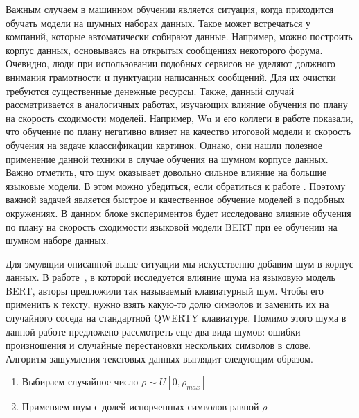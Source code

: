 \documentclass{spbau-diploma}
\begin{document}
Важным случаем в машинном обучении является ситуация, когда приходится обучать модели на шумных наборах данных. Такое может встречаться у компаний, которые автоматически собирают данные. Например, можно построить корпус данных, основываясь на открытых сообщениях некоторого форума. Очевидно, люди при использовании подобных сервисов не уделяют должного внимания грамотности и пунктуации написанных сообщений. Для их очистки требуются существенные денежные ресурсы. Также, данный случай рассматривается в аналогичных работах, изучающих влияние обучения по плану на скорость сходимости моделей. Например, Wu и его коллеги в работе \cite{wu2020curricula} показали, что обучение по плану негативно влияет на качество итоговой модели и скорость обучения на задаче классификации картинок. Однако, они нашли полезное применение данной техники в случае обучения на шумном корпусе данных. Важно отметить, что шум оказывает довольно сильное влияние на большие языковые модели. В этом можно убедиться, если обратиться к работе \cite{srivastava2020noisy}. Поэтому важной задачей является быстрое и качественное обучение моделей в подобных окружениях. В данном блоке экспериментов будет исследовано влияние обучения по плану на скорость сходимости языковой модели BERT при ее обучении на шумном наборе данных.

Для эмуляции описанной выше ситуации мы искусственно добавим шум в корпус данных. В работе~\cite{srivastava2020noisy}, в которой исследуется влияние шума на языковую модель BERT, авторы предложили так называемый клавиатурный шум. Чтобы его применить к тексту, нужно взять какую-то долю символов и заменить их на случайного соседа на стандартной QWERTY клавиатуре. Помимо этого шума в данной работе предложено рассмотреть еще два вида шумов: ошибки произношения и случайные перестановки нескольких символов в слове. Алгоритм зашумления текстовых данных выглядит следующим образом.

\begin{enumerate}
	\item Выбираем случайное число $\rho \sim U[0, \rho_{max}]$
	\item Применяем шум с долей испорченных символов равной $\rho$
\end{enumerate}
\end{document}

